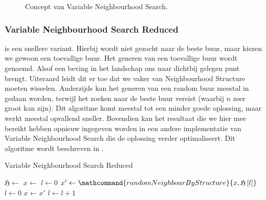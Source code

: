 \begin{figure}[htb]
\centering
{}
\caption{Concept van Variable Neighbourhood Search.}
\label{fig:variableNeighbourhoodSearchConcept}
\end{figure}
\subsubsection{Variable Neighbourhood Search Reduced}
 is een snellere variant. Hierbij wordt niet gezocht naar de beste buur, maar kiezen we gewoon een toevallige buur. Het generen van een toevallige buur wordt  genoemd. Alsof een beving in het landschap ons naar dichtbij gelegen punt brengt. Uiteraard leidt dit er toe dat we vaker van Neighbourhood Structure moeten wisselen. Anderzijds kan het generen van een random buur meestal in  gedaan worden, terwijl het zoeken naar de beste buur  vereist (waarbij $n$ zeer groot kan zijn). Dit algoritme komt meestal tot een minder goede oplossing, maar werkt meestal opvallend sneller. Bovendien kan het resultaat die we hier mee bereikt hebben opnieuw ingegeven worden in een andere implementatie van Variable Neighbourhood Search die de oplossing verder optimaliseert. Dit algoritme wordt beschreven in .
\begin{algorithm}[htb]
\caption{Variable Neighbourhood Search Reduced}
\label{alg:variableNeighbourhoodSearchReduced}
\begin{algorithmic}[1]
\STATE $\mathfrak{H}\leftarrow$
\STATE $x\leftarrow$
\STATE $l\leftarrow 0$
\STATE $x'\leftarrow\mathcommand{randomNeighbourByStructure}{x,\mathfrak{H}\left[l\right]}$
\STATE $l\leftarrow 0$
\STATE $x\leftarrow x'$
\ELSE
\STATE $l\leftarrow l+1$
\ENDIF
\ENDWHILE
\end{algorithmic}
\end{algorithm}
